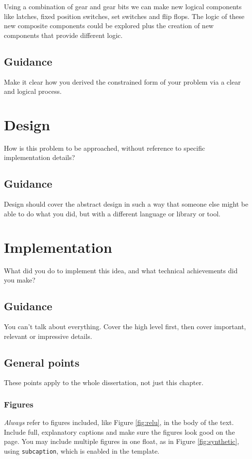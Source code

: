 \documentclass{l4proj}
\begin{document}
Using a combination of gear and gear bits we can make new logical components like latches, fixed position switches, set switches and flip flops. The logic of these
new composite components could be explored plus the creation of new components that provide different logic.
\section{Guidance}
Make it clear how you derived the constrained form of your problem via a clear and logical process. 

\chapter{Design}
How is this problem to be approached, without reference to specific implementation details? 
\section{Guidance}
Design should cover the abstract design in such a way that someone else might be able to do what you did, but with a different language or library or tool.

\chapter{Implementation}
What did you do to implement this idea, and what technical achievements did you make?
\section{Guidance}
You can't talk about everything. Cover the high level first, then cover important, relevant or impressive details.



\section{General points}

These points apply to the whole dissertation, not just this chapter.



\subsection{Figures}
\emph{Always} refer to figures included, like Figure \ref{fig:relu}, in the body of the text. Include full, explanatory captions and make sure the figures look good on the page.
You may include multiple figures in one float, as in Figure \ref{fig:synthetic}, using \texttt{subcaption}, which is enabled in the template.
\end{document}
